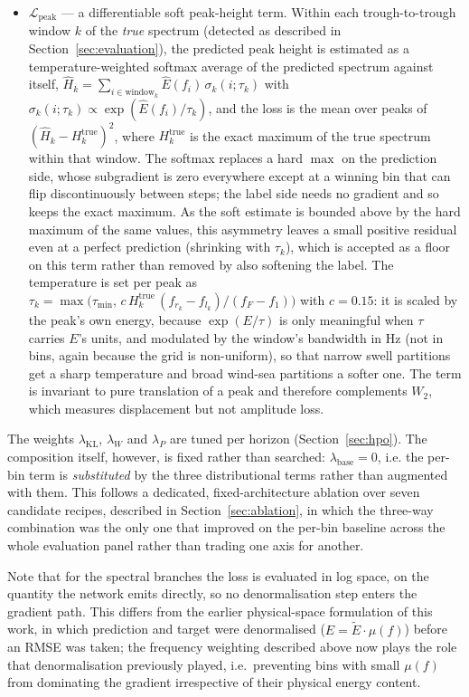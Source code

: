\begin{itemize}
  \item $\mathcal{L}_{\text{peak}}$ — a differentiable soft peak-height term. Within each trough-to-trough window $k$ of the \emph{true} spectrum (detected as described in Section~\ref{sec:evaluation}), the predicted peak height is estimated as a temperature-weighted softmax average of the predicted spectrum against itself, $\hat{H}_k = \sum_{i \in \text{window}_k} \hat{E}(f_i)\,\sigma_k(i;\tau_k)$ with $\sigma_k(i;\tau_k) \propto \exp(\hat{E}(f_i)/\tau_k)$, and the loss is the mean over peaks of $(\hat{H}_k - H_k^{\text{true}})^2$, where $H_k^{\text{true}}$ is the exact maximum of the true spectrum within that window. The softmax replaces a hard $\max$ on the prediction side, whose subgradient is zero everywhere except at a winning bin that can flip discontinuously between steps; the label side needs no gradient and so keeps the exact maximum. As the soft estimate is bounded above by the hard maximum of the same values, this asymmetry leaves a small positive residual even at a perfect prediction (shrinking with $\tau_k$), which is accepted as a floor on this term rather than removed by also softening the label. The temperature is set per peak as $\tau_k = \max\!\big(\tau_{\min},\, c\,H_k^{\text{true}}\,(f_{r_k}-f_{l_k})/(f_F - f_1)\big)$ with $c=0.15$: it is scaled by the peak's own energy, because $\exp(E/\tau)$ is only meaningful when $\tau$ carries $E$'s units, and modulated by the window's bandwidth in Hz (not in bins, again because the grid is non-uniform), so that narrow swell partitions get a sharp temperature and broad wind-sea partitions a softer one. The term is invariant to pure translation of a peak and therefore complements $W_2$, which measures displacement but not amplitude loss.
\end{itemize}
The weights $\lambda_{\text{KL}}$, $\lambda_{W}$ and $\lambda_{P}$ are tuned per horizon (Section~\ref{sec:hpo}). The composition itself, however, is fixed rather than searched: $\lambda_{\text{base}} = 0$, i.e. the per-bin term is \emph{substituted} by the three distributional terms rather than augmented with them. This follows a dedicated, fixed-architecture ablation over seven candidate recipes, described in Section~\ref{sec:ablation}, in which the three-way combination was the only one that improved on the per-bin baseline across the whole evaluation panel rather than trading one axis for another.

Note that for the spectral branches the loss is evaluated in log space, on the quantity the network emits directly, so no denormalisation step enters the gradient path. This differs from the earlier physical-space formulation of this work, in which prediction and target were denormalised ($E = \tilde{E}\cdot\mu(f)$) before an RMSE was taken; the frequency weighting described above now plays the role that denormalisation previously played, i.e.\ preventing bins with small $\mu(f)$ from dominating the gradient irrespective of their physical energy content.

